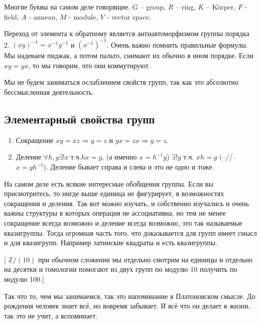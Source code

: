 Многие буквы на самом деле говорящие. $G$ – group, $R$ – ring, $K$ – Körper,
$F$ - field, $A$ - anneau, $M$ - module, $V$ - vector space.

Переход от элемента к обратному является антиавтоморфизмом группы порядка 2.
$(xy)^{-1} = x^{-1}y^{-1}$ и $(x^{-1})^{-1}$. Очень важно помнить правильные
формулы. Мы надеваем пиджак, а потом пальто, снимают их обычно в ином порядке.
Если $xy=yx$, то мы говорим, что они коммутируют.

Мы не будем заниматься ослаблением свойств групп, так как это абсолютно
бессмысленная деятельность.

\subsection{Элементарный свойства групп}
\begin{enumerate}
    \item Сокращение $xy = xz\Rightarrow y=z$ и $yx=zx\Rightarrow y=z$.
    \item Деление $\forall h,g\exists !x\;\text{т.ч.} hx=g$, (а именно
        $x=h^{-1}g$) $\exists!y$ т.ч. $xh=g$ (–//– $x=gh^{-1}$). Деление
        бывает справа и слева и это не одно и тоже.
\end{enumerate}

На самом деле есть всякие интересные обобщения группы. Если вы присмотритесь,
то нигде выше единица не фигурирует, в возможностях сокращения и деления. Так
вот можно изучать, и собственно изучались и очень важны структуры в которых
операция не ассоциативна, но тем не менее сокращение всегда возможно и деление
всегда возможно, это так называемые квазигруппы. Тогда огромная часть того,
что доказывается для групп имеет смысл и для квазигрупп. Например латинские
квадраты и есть квазигруппы. 

[ $\mathbb{Z}/(10)$ при обычном сложении мы отдельно смотрим на единицы и
отдельно на десятки и гомологии помогают из двух групп по модулю 10 получить
по модулю 100.]

Так что то, чем мы занимаемся, так это напоминание в Платоновском смысле. До
рождения человек знает всё, но вовремя забывает. И всё что он делает в жизни,
так это не учит, а вспоминает.

